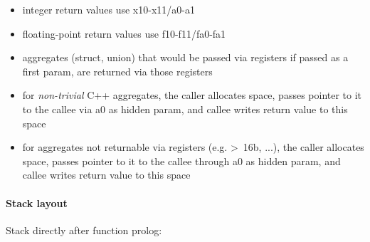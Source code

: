 \begin{itemize}
\item integer return values use x10-x11/a0-a1
\item floating-point return values use f10-f11/fa0-fa1
\item aggregates (struct, union) that would be passed via registers if passed as a first param, are returned via those registers
\item for {\it non-trivial} C++ aggregates, the caller allocates space, passes pointer to it to the callee via a0 as hidden param, and callee writes return value to this space
\item for aggregates not returnable via registers (e.g. \textgreater\ 16b, ...), the caller allocates space, passes pointer to it to the callee through
a0 as hidden param, and callee writes return value to this space
\end{itemize}

\clearpage

\paragraph{Stack layout}

Stack directly after function prolog:\\

